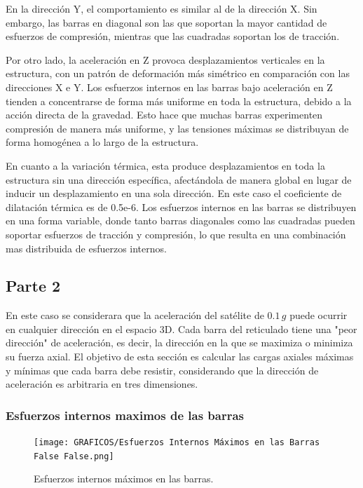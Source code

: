 En la dirección Y, el comportamiento es similar al de la dirección X. Sin embargo, las barras en diagonal son las que soportan la mayor cantidad de esfuerzos de compresión, mientras que las cuadradas soportan los de tracción.

Por otro lado, la aceleración en Z provoca desplazamientos verticales en la estructura, con un patrón de deformación más simétrico en comparación con las direcciones X e Y. Los esfuerzos internos en las barras bajo aceleración en Z tienden a concentrarse de forma más uniforme en toda la estructura, debido a la acción directa de la gravedad. Esto hace que muchas barras experimenten compresión de manera más uniforme, y las tensiones máximas se distribuyan de forma homogénea a lo largo de la estructura.

En cuanto a la variación térmica, esta produce desplazamientos en toda la estructura sin una dirección específica, afectándola de manera global en lugar de inducir un desplazamiento en una sola dirección. En este caso el coeficiente de dilatación térmica es de 0.5e-6. Los esfuerzos internos en las barras se distribuyen en una forma variable, donde tanto barras diagonales como las cuadradas pueden soportar esfuerzos de tracción y compresión, lo que resulta en una combinación mas distribuida de esfuerzos internos.

\subsection{Parte 2}

En este caso se considerara que la aceleración del satélite de \(0.1 \, g\) puede ocurrir en cualquier dirección en el espacio 3D. Cada barra del reticulado tiene una "peor dirección" de aceleración, es decir, la dirección en la que se maximiza o minimiza su fuerza axial. El objetivo de esta sección es calcular las cargas axiales máximas y mínimas que cada barra debe resistir, considerando que la dirección de aceleración es arbitraria en tres dimensiones.

\subsubsection{Esfuerzos internos maximos de las barras}

\begin{figure}[H]
    \centering
    \texttt{[image: GRAFICOS/Esfuerzos Internos Máximos en las Barras False False.png]}
    \caption{Esfuerzos internos máximos en las barras.}
    \label{fig:imagen9}
\end{figure}

